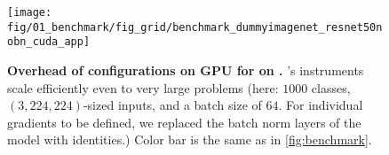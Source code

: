 \begin{figure}[t]
	\centering
	\texttt{[image: fig/01\_benchmark/fig\_grid/benchmark\_dummyimagenet\_resnet50nobn\_cuda\_app]}
	
	\caption{\textbf{Overhead of \cockpittitle configurations on GPU for \resnetfifty on
			\imagenet.} \cockpit's instruments scale efficiently even to very large problems
			(here: $1000$ classes, $(3, 224, 224)$-sized inputs, and a batch size of $64$.
			For individual gradients to be defined, we replaced the batch norm layers of the 
			\resnetfifty model with identities.) Color bar is the same as in \autoref{fig:benchmark}.}
	\label{fig:app_benchmark_configurations_gpu_imagenet}
\end{figure}


